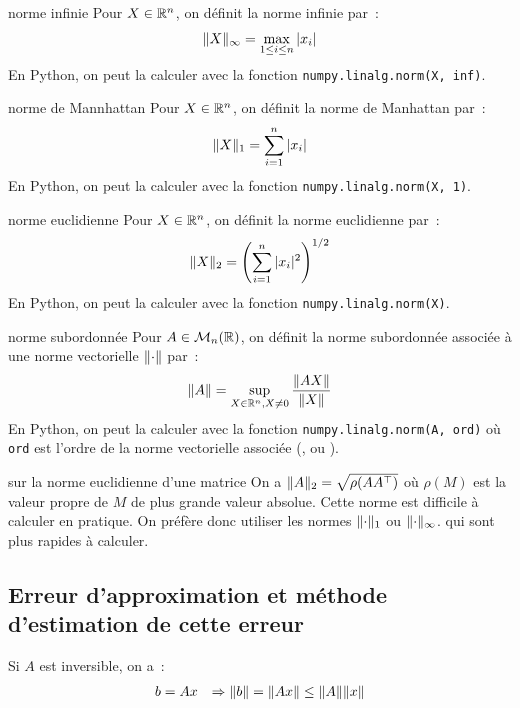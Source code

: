 \begin{definition}{}{norme infinie}
    Pour $X \in \mathbb{R}^n$, on définit la norme infinie par~:
    $$\lVert X\rVert_\infty = \max_{1 \leq i \leq n} |x_i|$$
    En Python, on peut la calculer avec la fonction \texttt{numpy.linalg.norm(X, inf)}.
\end{definition}

\begin{definition}{}{norme de Mannhattan}
    Pour $X \in \mathbb{R}^n$, on définit la norme de Manhattan par~:
    $$\lVert X\rVert_1 = \sum_{i=1}^n |x_i|$$
    En Python, on peut la calculer avec la fonction \texttt{numpy.linalg.norm(X, 1)}.
\end{definition}

\begin{definition}{}{norme euclidienne}
    Pour $X \in \mathbb{R}^n$, on définit la norme euclidienne par~:
    $$\lVert X\rVert_2 = \left(\sum_{i=1}^n |x_i|^2\right)^{1/2}$$
    En Python, on peut la calculer avec la fonction \texttt{numpy.linalg.norm(X)}.
\end{definition}

\begin{definition}{}{norme subordonnée}
    Pour $A \in \mathcal{M}_{n}(\mathbb{R})$, on définit la norme subordonnée associée à une norme vectorielle $\lVert\cdot\rVert$ par~:
    $$\lVert A\rVert = \sup_{X \in \mathbb{R}^n, X \neq 0} \frac{\lVert AX\rVert}{\lVert X\rVert}$$
    En Python, on peut la calculer avec la fonction \texttt{numpy.linalg.norm(A, ord)} où \texttt{ord} est l'ordre de la norme vectorielle associée (,  ou ).
    
\end{definition}


\begin{remarque}{}{sur la norme euclidienne d'une matrice}
    On a $\lVert A\rVert_2 = \sqrt{\rho(AA^\top)}$ où $\rho(M)$ est la valeur propre de $M$ de plus grande valeur absolue.
    Cette norme est difficile à calculer en pratique. On préfère donc utiliser les normes $\lVert\cdot\rVert_1$ ou $\lVert\cdot\rVert_\infty$. qui sont plus rapides à calculer.
    
\end{remarque}

\subsection{Erreur d'approximation et méthode d'estimation de cette erreur}

Si $A$ est inversible, on a~:
\begin{align*}
    b &= Ax
    &\Rightarrow \lVert b\rVert &= \lVert Ax\rVert \leq \lVert A\rVert\lVert x\rVert\\
\end{align*}


